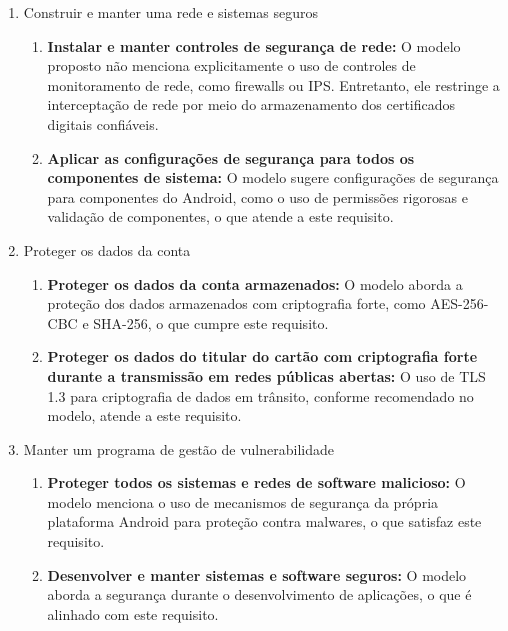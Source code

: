     \begin{enumerate}
        \item Construir e manter uma rede e sistemas seguros
            \begin{enumerate}
            \item \textbf{Instalar e manter controles de segurança de rede:} O modelo proposto não menciona explicitamente o uso de controles de monitoramento de rede, como firewalls ou IPS. Entretanto, ele restringe a interceptação de rede por meio do armazenamento dos certificados digitais confiáveis. 
            \item \textbf{Aplicar as configurações de segurança para todos os componentes de sistema:} O modelo sugere configurações de segurança para componentes do Android, como o uso de permissões rigorosas e validação de componentes, o que atende a este requisito.
            \end{enumerate}

        \item Proteger os dados da conta
            \begin{enumerate}
            \item \textbf{Proteger os dados da conta armazenados:} O modelo aborda a proteção dos dados armazenados com criptografia forte, como AES-256-CBC e SHA-256, o que cumpre este requisito.
            \item \textbf{Proteger os dados do titular do cartão com criptografia forte durante a transmissão em redes públicas abertas:} O uso de TLS 1.3 para criptografia de dados em trânsito, conforme recomendado no modelo, atende a este requisito.
            \end{enumerate}

        \item Manter um programa de gestão de vulnerabilidade
            \begin{enumerate}
            \item \textbf{Proteger todos os sistemas e redes de software malicioso:} O modelo menciona o uso de mecanismos de segurança da própria plataforma Android para proteção contra malwares, o que satisfaz este requisito. 
            \item \textbf{Desenvolver e manter sistemas e software seguros:} O modelo aborda a segurança durante o desenvolvimento de aplicações, o que é alinhado com este requisito. 
            \end{enumerate}


\end{enumerate}
